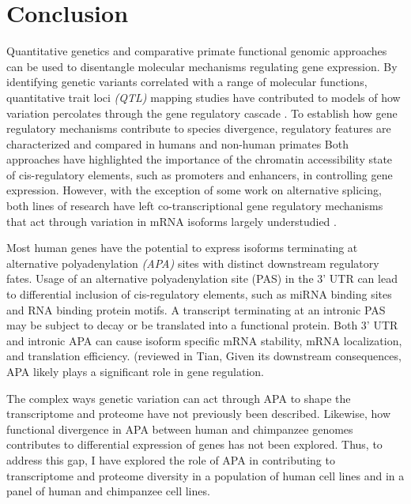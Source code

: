 \chapter{Conclusion}\label{conclusion}


Quantitative genetics and comparative primate functional genomic approaches can be used to disentangle molecular mechanisms regulating gene expression. By identifying genetic variants correlated with a range of molecular functions, quantitative trait loci \emph{(QTL)} mapping studies have contributed to models of how variation percolates through the gene regulatory cascade \citep{degner_dnase_2012, mcvicker_identification_2013, li_rna_2016, pickrell_understanding_2010}. To establish how gene regulatory mechanisms contribute to species divergence, regulatory features are characterized and compared in humans and non-human primates \citep{pai_comparative_2014, romero_widespread_2018, eres_reorganization_2019, blake_comparison_2020, khan_primate_2013, pai_genome-wide_2011, shibata_extensive_2012-1} Both approaches have highlighted the importance of the chromatin accessibility state of cis-regulatory elements, such as promoters and enhancers, in controlling gene expression. However, with the exception of some work on alternative splicing, both lines of research have left co-transcriptional gene regulatory mechanisms that act through variation in mRNA isoforms largely understudied \citep{blekhman_sex-specific_2010, li_rna_2016}. 


Most human genes have the potential to express isoforms terminating at alternative polyadenylation \emph{(APA)} sites with distinct downstream regulatory fates. Usage of an alternative polyadenylation site (PAS) in the 3' UTR can lead to differential inclusion of cis-regulatory elements, such as miRNA binding sites and RNA binding protein motifs. A transcript terminating at an intronic PAS may be subject to decay or be translated into a functional protein. Both 3' UTR and intronic APA can cause isoform specific mRNA stability, mRNA localization, and translation efficiency. (reviewed in Tian, \citep{tian_alternative_2017} Given its downstream consequences, APA likely plays a significant role in gene regulation.

 The complex ways genetic variation can act through APA to shape the transcriptome and proteome have not previously been described. Likewise, how functional divergence in APA between human and chimpanzee genomes contributes to differential expression of genes has not been explored. Thus, to address this gap, I have explored the role of APA in contributing to transcriptome and proteome diversity in a population of human cell lines and in a panel of human and chimpanzee cell lines.
 
